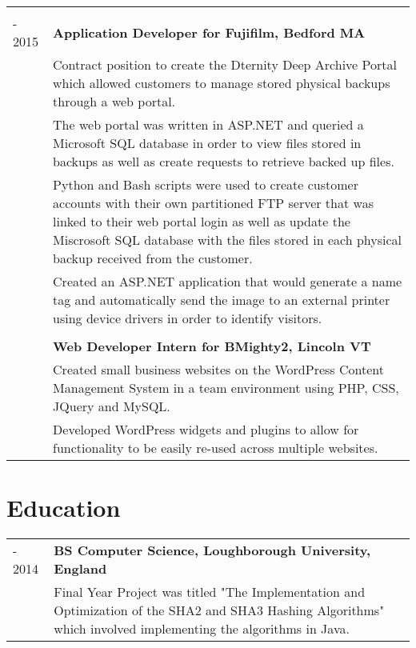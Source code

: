 \documentclass[12pt, letterpaper]{article}
\begin{document}
\begin{longtable}{p{1in}|p{6in}}
	\multicolumn{2}{c}{}\\
	\centering 2014 - 2015 & \textbf{Application Developer for Fujifilm, Bedford MA}\vspace{0.1cm}\\&
	Contract position to create the Dternity Deep Archive Portal which allowed customers to manage stored physical backups through a web portal.\vspace{0.2cm}\\&
        The web portal was written in ASP.NET and queried a Microsoft SQL database in order to view files stored in backups as well as create requests to retrieve backed up files.\vspace{0.2cm}\\&
        Python and Bash scripts were used to create customer accounts with their own partitioned FTP server that was linked to their web portal login as well as update the Miscrosoft SQL database with the files stored in each physical backup received from the customer.\vspace{0.2cm}\\&
        Created an ASP.NET application that would generate a name tag and automatically send the image to an external printer using device drivers in order to identify visitors.\\
	\multicolumn{2}{c}{}\\
	\centering 2013 & \textbf{Web Developer Intern for BMighty2, Lincoln VT}\vspace{0.1cm}\\&
	Created small business websites on the WordPress Content Management System in a team environment using PHP, CSS, JQuery and MySQL.\vspace{0.2cm}\\&
        Developed WordPress widgets and plugins to allow for functionality to be easily re-used across multiple websites.\\
\end{longtable}
\vspace{-0.7cm}
\section*{\selectfont Education}
\vspace{-0.5cm}
\begin{longtable}{p{1in}|p{6in}}
	\centering 2011 - 2014 & \textbf{BS Computer Science, Loughborough University, England}\vspace{0.1cm}\\&
	\small{Final Year Project was titled "The Implementation and Optimization of the SHA2 and SHA3 Hashing Algorithms" which involved implementing the algorithms in Java.}\\
\end{longtable}
\end{document}
